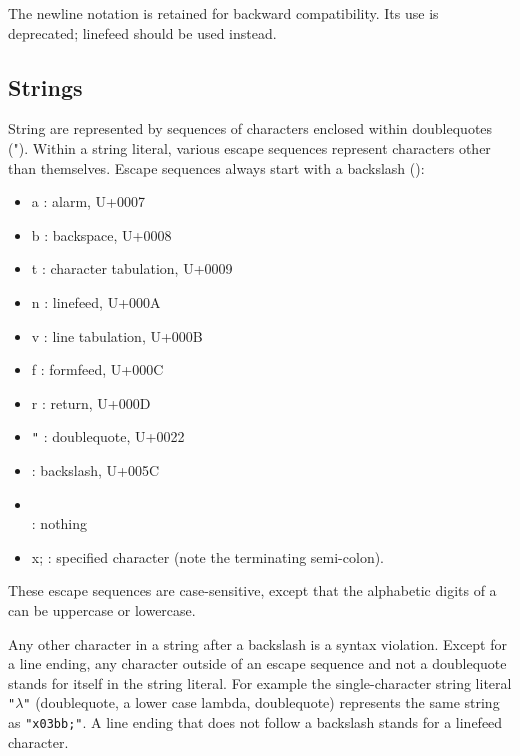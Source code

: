 \begin{note}
  The {\cf\sharpsign\backwhack{}newline} notation is retained for
  backward compatibility.  Its use is deprecated;
  {\cf\sharpsign\backwhack{}linefeed} should be used instead.
\end{note}

\subsection{Strings}

\vest String are represented by sequences of characters enclosed within doublequotes
({\cf "}).  Within a string literal, various escape
sequences represent characters other than
themselves.  Escape sequences always start with a backslash (\backwhack{}):

\begin{itemize}
\item{\cf\backwhack{}a} : alarm, U+0007
\item{\cf\backwhack{}b} : backspace, U+0008 
\item{\cf\backwhack{}t} : character tabulation, U+0009 
\item{\cf\backwhack{}n} : linefeed, U+000A 
\item{\cf\backwhack{}v} : line tabulation, U+000B 
\item{\cf\backwhack{}f} : formfeed, U+000C 
\item{\cf\backwhack{}r} : return, U+000D 
\item{\cf\backwhack{}}\verb|"| : doublequote, U+0022 
\item{\cf\backwhack{}\backwhack{}} : backslash, U+005C 
\item{\cf\backwhack{}}\\\hspace*{2em} : nothing
\item{\cf\backwhack{}x;} : specified character (note the
  terminating semi-colon).
\end{itemize}

These escape sequences are case-sensitive, except that the alphabetic
digits of a  can be uppercase or lowercase.

Any other character in a string after a backslash is a syntax violation. Except
for a line ending, any
character outside of an escape sequence and not a doublequote stands
for itself in the string literal. For example the single-character
string literal {\tt "$\lambda$"} (doublequote, a lower case lambda, doublequote)
represents the same string as {\tt "\backwhack{}x03bb;"}.
A line ending that does not follow a backslash stands for a linefeed character.

